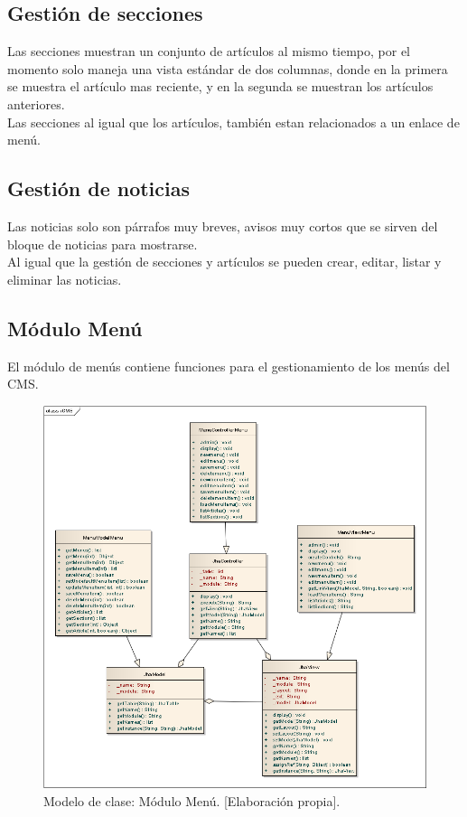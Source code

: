 \subsection{Gesti\'on de secciones}
Las secciones muestran un conjunto de art\'iculos al mismo tiempo, por el momento solo maneja una vista est\'andar de dos columnas, donde en la primera se muestra el art\'iculo mas reciente, y en la segunda se muestran los art\'iculos anteriores.\\
Las secciones al igual que los art\'iculos, tambi\'en estan relacionados a un enlace de men\'u.

\subsection{Gesti\'on de noticias}
Las noticias solo son p\'arrafos muy breves, avisos muy cortos que se sirven del bloque de noticias para mostrarse.\\
Al igual que la gesti\'on de secciones y art\'iculos se pueden crear, editar, listar y eliminar las noticias.

\newpage
\subsection{M\'odulo Men\'u}
El m\'odulo de men\'us contiene funciones para el gestionamiento de los men\'us del CMS.

\begin{figure}[h]
\centering
\includegraphics[scale=.4, keepaspectratio=true]{imagenes/15_imagen.png}
\caption{Modelo de clase: M\'odulo Men\'u. [Elaboraci\'on propia].}
\end{figure}

